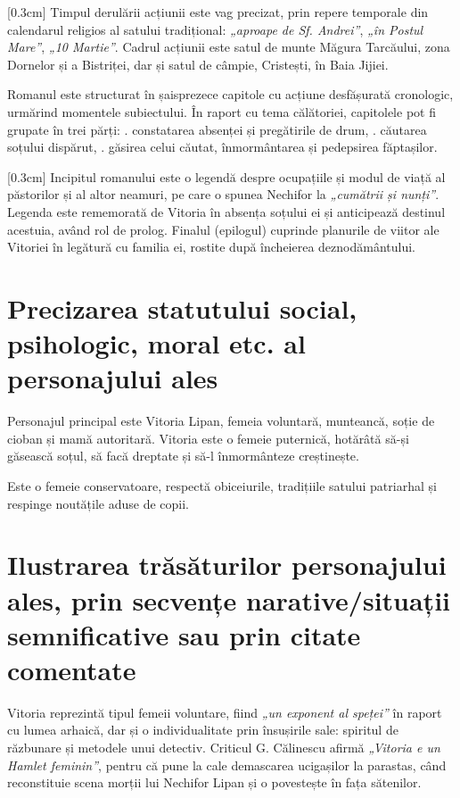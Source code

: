 [0.3cm]
Timpul derulării acțiunii este vag precizat, prin repere temporale din calendarul religios al satului tradițional: \textit{„aproape de Sf. Andrei”}, \textit{„în Postul Mare”}, \textit{„10 Martie”}. Cadrul acțiunii este satul de munte Măgura Tarcăului, zona Dornelor și a Bistriței, dar și satul de câmpie, Cristești, în Baia Jijiei.

Romanul este structurat în șaisprezece capitole cu acțiune desfășurată cronologic, urmărind momentele subiectului. În raport cu tema călătoriei, capitolele pot fi grupate în trei părți: . constatarea absenței și pregătirile de drum, . căutarea soțului dispărut, . găsirea celui căutat, înmormântarea și pedepsirea făptașilor.

[0.3cm]
Incipitul romanului este o legendă despre ocupațiile și modul de viață al păstorilor și al altor neamuri, pe care o spunea Nechifor la \textit{„cumătrii și nunți”}. Legenda este rememorată de Vitoria în absența soțului ei și anticipează destinul acestuia, având rol de prolog. Finalul (epilogul) cuprinde planurile de viitor ale Vitoriei în legătură cu familia ei, rostite după încheierea deznodământului.


\section{Precizarea statutului social, psihologic, moral etc. al personajului ales}

Personajul principal este Vitoria Lipan, femeia voluntară, munteancă, soție de cioban și mamă autoritară. Vitoria este o femeie puternică, hotărâtă să-și găsească soțul, să facă dreptate și să-l înmormânteze creștinește.

Este o femeie conservatoare, respectă obiceiurile, tradițiile satului patriarhal și respinge noutățile aduse de copii.


\section{Ilustrarea trăsăturilor personajului ales, prin secvențe narative/situații semnificative sau prin citate comentate}

Vitoria reprezintă tipul femeii voluntare, fiind \textit{„un exponent al speței”} în raport cu lumea arhaică, dar și o individualitate prin însușirile sale: spiritul de răzbunare și metodele unui detectiv. Criticul G. Călinescu afirmă \textit{„Vitoria e un Hamlet feminin”}, pentru că pune la cale demascarea ucigașilor la parastas, când reconstituie scena morții lui Nechifor Lipan și o povestește în fața sătenilor.

